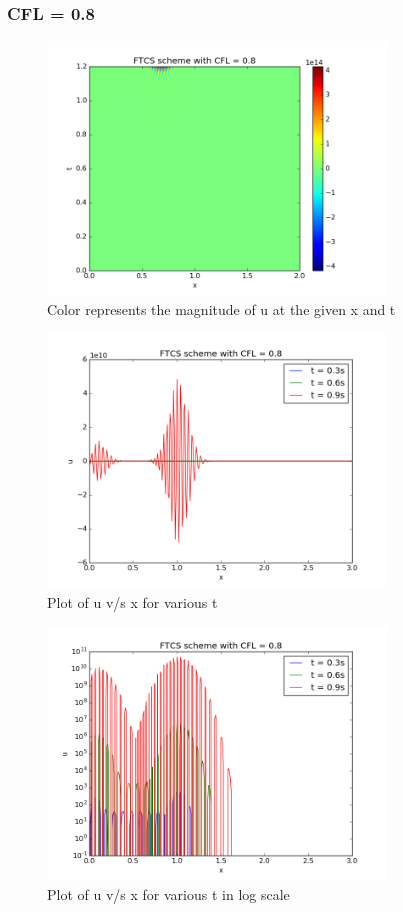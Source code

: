 \documentclass[11pt, a4paper]{article}
\begin{document}
\subsubsection{CFL = 0.8}
\begin{figure}[H]
 \centering
 \includegraphics[width = 0.8\textwidth]{FTCS3_08.png}
 \caption{Color represents the magnitude of u at the given x and t}
\end{figure}

\begin{figure}[H]
 \centering
 \includegraphics[width = 0.8\textwidth]{FTCS3_08_1.png}
 \caption{Plot of u v/s x for various t}
\end{figure}

\begin{figure}[H]
 \centering
 \includegraphics[width = 0.8\textwidth]{FTCS3_08_1_log.png}
 \caption{Plot of u v/s x for various t in log scale}
\end{figure}
\end{document}
